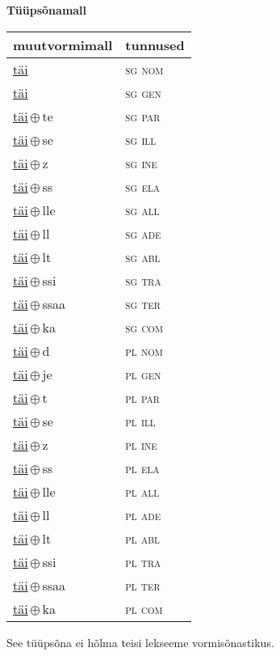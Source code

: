 

\vspace{3.5em}
\noindent \begin{minipage}{\textwidth}
\noindent \textbf{Tüüpsõnamall \,}\\

\begin{sideways}
\begin{tabular}{l l}
muutvormimall & tunnused \\
\hline
\underline{täi} & \textsc{ sg nom } \\
\underline{täi} & \textsc{ sg gen } \\
\underline{täi}\,$\oplus$\,te & \textsc{ sg par } \\
\underline{täi}\,$\oplus$\,se & \textsc{ sg ill } \\
\underline{täi}\,$\oplus$\,z & \textsc{ sg ine } \\
\underline{täi}\,$\oplus$\,ss & \textsc{ sg ela } \\
\underline{täi}\,$\oplus$\,lle & \textsc{ sg all } \\
\underline{täi}\,$\oplus$\,ll & \textsc{ sg ade } \\
\underline{täi}\,$\oplus$\,lt & \textsc{ sg abl } \\
\underline{täi}\,$\oplus$\,ssi & \textsc{ sg tra } \\
\underline{täi}\,$\oplus$\,ssaa & \textsc{ sg ter } \\
\underline{täi}\,$\oplus$\,ka & \textsc{ sg com } \\
\underline{täi}\,$\oplus$\,d & \textsc{ pl nom } \\
\underline{täi}\,$\oplus$\,je & \textsc{ pl gen } \\
\underline{täi}\,$\oplus$\,t & \textsc{ pl par } \\
\underline{täi}\,$\oplus$\,se & \textsc{ pl ill } \\
\underline{täi}\,$\oplus$\,z & \textsc{ pl ine } \\
\underline{täi}\,$\oplus$\,ss & \textsc{ pl ela } \\
\underline{täi}\,$\oplus$\,lle & \textsc{ pl all } \\
\underline{täi}\,$\oplus$\,ll & \textsc{ pl ade } \\
\underline{täi}\,$\oplus$\,lt & \textsc{ pl abl } \\
\underline{täi}\,$\oplus$\,ssi & \textsc{ pl tra } \\
\underline{täi}\,$\oplus$\,ssaa & \textsc{ pl ter } \\
\underline{täi}\,$\oplus$\,ka & \textsc{ pl com } \\
\end{tabular}
\end{sideways}
\label{tab:tüüpsõnamall-täi}

\end{minipage}

 
\vspace{1em}
\noindent See tüüpsõna ei hõlma teisi lekseeme vormi\-sõnastikus.

